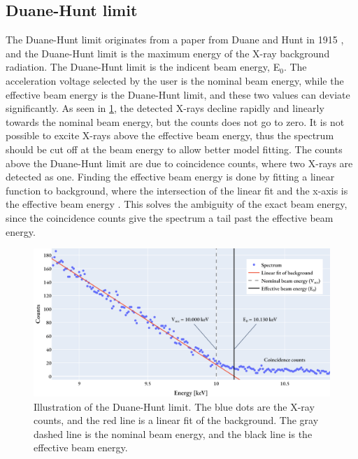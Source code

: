 \subsection{Duane-Hunt limit}
\label{theory:qc:duanehunt}

The Duane-Hunt limit originates from a paper from Duane and Hunt in 1915 \cite{Duane_Hunt_1915}, and the Duane-Hunt limit is the maximum energy of the X-ray background radiation.
The Duane-Hunt limit is the indicent beam energy, E$_0$. 
The acceleration voltage selected by the user is the nominal beam energy, while the effective beam energy is the Duane-Hunt limit, and these two values can deviate significantly.
As seen in \cref{fig:duanehunt}, the detected X-rays decline rapidly and linearly towards the nominal beam energy, but the counts does not go to zero.
It is not possible to excite X-rays above the effective beam energy, thus the spectrum should be cut off at the beam energy to allow better model fitting.
The counts above the Duane-Hunt limit are due to coincidence counts, where two X-rays are detected as one.
Finding the effective beam energy is done by fitting a linear function to background, where the intersection of the linear fit and the x-axis is the effective beam energy \cite{software_dtsaii} \cite[Ch. 9.1.3]{goldstein_scanning_2018}.
This solves the ambiguity of the exact beam energy, since the coincidence counts give the spectrum a tail past the effective beam energy.

\begin{figure}[ht]
    \centering
    \includegraphics[width=0.8\linewidth]{figures/Duane-Hunt.png}
    \caption{
        Illustration of the Duane-Hunt limit.
        The blue dots are the X-ray counts, and the red line is a linear fit of the background.
        The gray dashed line is the nominal beam energy, and the black line is the effective beam energy.
    }
    \label{fig:duanehunt}
\end{figure}

